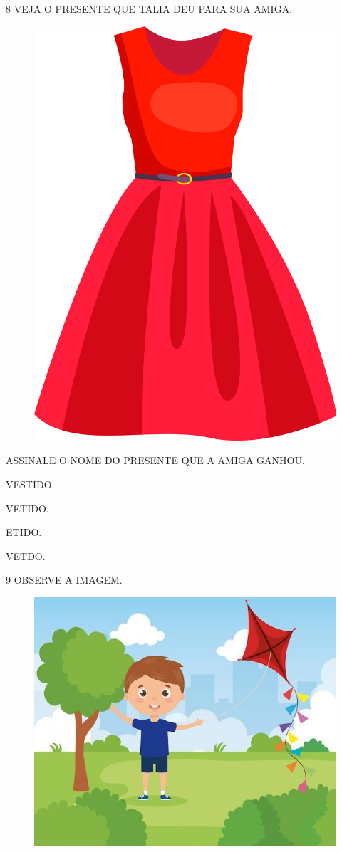 \num{8} VEJA O PRESENTE QUE TALIA DEU PARA SUA AMIGA.

\begin{figure}[H]
\centering
\includegraphics[width=.4\textwidth]{media/image232.png}
\end{figure}

ASSINALE O NOME DO PRESENTE QUE A AMIGA GANHOU.

\begin{multicols}{2}
\begin{escolha}
\item VESTIDO.

\item VETIDO.

\item ETIDO.

\item VETDO.
\end{escolha}
\end{multicols}

\num{9} OBSERVE A IMAGEM.

\begin{figure}[H]
\centering
\includegraphics[width=\textwidth]{media/image233.jpg}
\end{figure}

